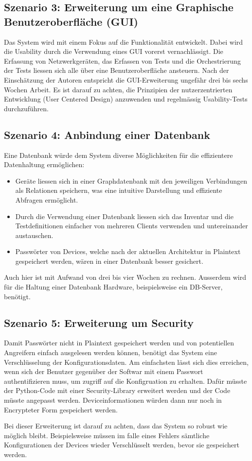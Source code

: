 \documentclass[
	ngerman,
	toc=listof, %
	toc=bibliography, %
	footnotes=multiple, %
	parskip=half, %
	numbers=noendperiod %
]{scrartcl}
\begin{document}
	\subsection{Szenario 3: Erweiterung um eine Graphische Benutzeroberfläche (GUI)}
	Das System wird mit einem Fokus auf die Funktionalität entwickelt.
	Dabei wird die Usability durch die Verwendung eines GUI vorerst vernachlässigt.
	Die Erfassung von Netzwerkgeräten, das Erfassen von Tests und die Orchestrierung der Tests liessen sich alle über eine Benutzeroberfläche ansteuern.
	Nach der Einschätzung der Autoren entspricht die GUI-Erweiterung ungefähr drei bis sechs Wochen Arbeit.
	Es ist darauf zu achten, die Prinzipien der nutzerzentrierten Entwicklung (User Centered Design) anzuwenden und regelmässig Usability-Tests durchzuführen.

	\subsection{Szenario 4: Anbindung einer Datenbank}
	Eine Datenbank würde dem System diverse Möglichkeiten für die effizientere Datenhaltung ermöglichen:
	\begin{itemize}
		\item Geräte liessen sich in einer Graphdatenbank mit den jeweiligen Verbindungen als Relationen speichern, was eine intuitive Darstellung und effiziente Abfragen ermöglicht.
		\item Durch die Verwendung einer Datenbank liessen sich das Inventar und die Testdefinitionen einfacher von mehreren Clients verwenden und untereinander austauschen.
		\item Passwörter von Devices, welche nach der aktuellen Architektur in Plaintext gespeichert werden, wären in einer Datenbank besser gesichert.
	\end{itemize}
	Auch hier ist mit Aufwand von drei bis vier Wochen zu rechnen. 
	Ausserdem wird für die Haltung einer Datenbank Hardware, beispielsweise ein DB-Server, benötigt.
	
	\subsection{Szenario 5: Erweiterung um Security}
	Damit Passwörter nicht in Plaintext gespeichert werden und von potentiellen Angreifern einfach ausgelesen werden können,
	benötigt das System eine  Verschlüsselung der Konfigurationsdaten. 
	Am einfachsten lässt sich dies erreichen, wenn sich der Benutzer gegenüber der Softwar mit einem Passwort authentifizieren muss, um zugriff auf die Konfigruation zu erhalten.
	Dafür müsste der Python-Code mit einer Security-Library erweitert werden und der Code müsste angepasst werden.
	Deviceinformationen würden dann nur noch in Encrypteter Form gespeichert werden.

	Bei dieser Erweiterung ist darauf zu achten, dass das System so robust wie möglich bleibt.
	Beispielsweise müssen im falle eines Fehlers sämtliche Konfigurationen der Devices wieder Verschlüsselt werden, bevor sie gespeichert werden.
	

	
\end{document}
